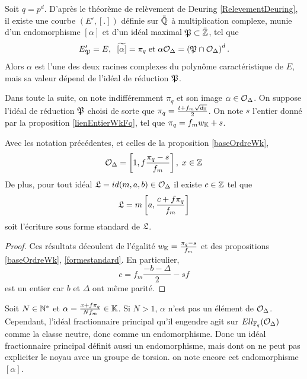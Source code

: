 \begin{Rem}
	Soit $q = p^d$. D'après le théorème de relèvement de Deuring \ref{RelevementDeuring}, il existe une courbe $\left( E',\left[ .\right] \right) $ définie sur $\bar{\mathbb{Q}}$ à multiplication complexe, munie d'un endomorphisme $\left[ \alpha\right] $ et d'un idéal maximal $\mathfrak{P}\subset\bar{\mathbb{Z}}$, tel que 
	\begin{equation*}
		E'_{\mathfrak{P}} = E,\;\;\widetilde{\left[ \alpha\right] } = \pi_{q}\;\mbox{et}\;\alpha\mathcal{O}_{\Delta} = \left(\mathfrak{P}\cap\mathcal{O}_{\Delta} \right)^{d}.
	\end{equation*}
	Alors $\alpha$ est l'une des deux racines complexes du polynôme caractéristique de $E$, mais sa valeur dépend de l'idéal de réduction $\mathfrak{P}$.
	
\end{Rem}

\begin{Def}
	Dans toute la suite, on note indifféremment $\pi_{q}$ et son image $\alpha\in\mathcal{O}_{\Delta}$. On suppose l'idéal de réduction $\mathfrak{P}$ choisi de sorte que $\pi_{q} = \frac{t + f_{m}\sqrt{d_{\mathbb{K}}}}{2}$. On note $s$ l'entier donné par la proposition \ref{lienEntierWkFq}, tel que $\pi_{q} = f_mw_{\mathbb{K}} + s$.
\end{Def}

\begin{Prop}\label{formeIdeauxBaseFq}
	
	Avec les notation précédentes, et celles de la proposition \ref{baseOrdreWk},
	\begin{equation*}
		\mathcal{O}_{\Delta} = \left[ 1, f\frac{\pi_{q} - s}{f_{m}}\right],\; x\in\mathbb{Z}
	\end{equation*}
	De plus, pour tout idéal $\mathfrak{L} = id(m,a,b)\in\mathcal{O}_{\Delta}$ il existe $c\in\mathbb{Z}$ tel que 
	\begin{equation*}
		\mathfrak{L} = m\left[ a, \frac{c + f\pi_{q}}{f_{m}}\right]
	\end{equation*}
	soit l'écriture sous forme standard de $\mathfrak{L}$. 
\end{Prop}

\begin{proof}
	Ces résultats découlent de l'égalité $w_{\mathbb{K}} = \frac{\pi_{q} - s}{f_{m}}$ et des propositions \ref{baseOrdreWk},  \ref{formestandard}. En particulier,
	\begin{equation*}
		c = f_m\frac{-b - \Delta}{2}  - sf
	\end{equation*}
	est un entier car $b$ et $\Delta$ ont même parité. 
\end{proof}

\begin{Rem}\label{endomorphismeFractionnaire}
	Soit $N\in\mathbb{N}^{*}$ et $\alpha =  \frac{x + f\pi_{q}}{Nf_m}\in\mathbb{K}$. Si $N > 1$, $\alpha$ n'est pas un élément de $\mathcal{O}_{\Delta}$. Cependant, l'idéal fractionnaire principal qu'il engendre agit sur $Ell_{\mathbb{F}_{q}}(\mathcal{O}_{\Delta})$ comme la classe neutre, donc comme un endomorphisme. Donc un idéal fractionnaire principal définit aussi un endomorphisme, mais dont on ne peut pas expliciter le noyau avec un groupe de torsion. on note encore cet endomorphisme $[\alpha]$. 
\end{Rem}


